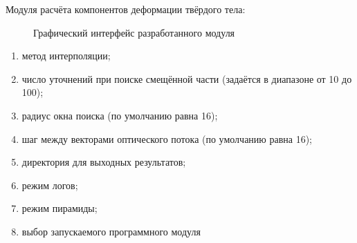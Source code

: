 Модуля расчёта компонентов деформации твёрдого тела:
\begin{figure}[h!]
\caption{Графический интерфейс разработанного модуля}
\label{pic:qml_screen}
\end{figure}
\begin{enumerate}
\item метод интерполяции;
\item число уточнений при поиске смещённой части (задаётся в диапазоне от 10 до 100);
\item радиус окна поиска (по умолчанию равна 16);
\item шаг между векторами оптического потока (по умолчанию равна 16);
\item директория для выходных результатов;
\item режим логов;
\item режим пирамиды;
\item выбор запускаемого программного модуля
\end{enumerate}